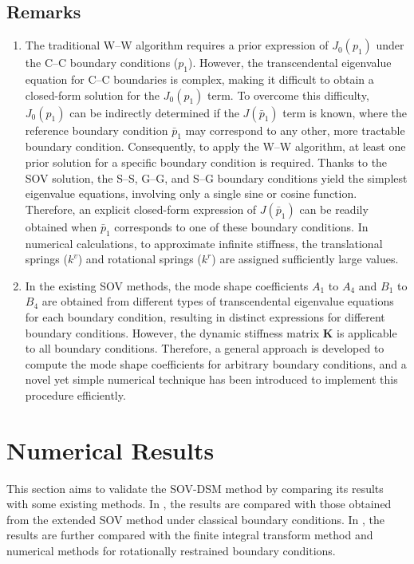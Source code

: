 \documentclass[preprint,12pt,number]{elsarticle}
\begin{document}
\subsection{Remarks}
\begin{enumerate}[label=(\roman*)]
	\item The traditional W–W algorithm requires a prior expression of $J_0(p_1)$ under the C–C boundary conditions ($p_1$).  
	However, the transcendental eigenvalue equation for C–C boundaries is complex, making it difficult to obtain a closed-form solution for the $J_0(p_1)$ term.  
	To overcome this difficulty, $J_0(p_1)$ can be indirectly determined if the $J(\bar{p}_1)$ term is known,  
	where the reference boundary condition $\bar{p}_1$ may correspond to any other, more tractable boundary condition.  
	Consequently, to apply the W–W algorithm, at least one prior solution for a specific boundary condition is required.  	
	Thanks to the SOV solution, the S–S, G–G, and S–G boundary conditions yield the simplest eigenvalue equations, involving only a single sine or cosine function.  
	Therefore, an explicit closed-form expression of $J(\bar{p}_1)$ can be readily obtained when $\bar{p}_1$ corresponds to one of these boundary conditions.  	
	In numerical calculations, to approximate infinite stiffness, the translational springs ($k^v$) and rotational springs ($k^r$) are assigned sufficiently large values.
	
	\item In the existing SOV methods, the mode shape coefficients $A_1$ to $A_4$ and $B_1$ to $B_4$ are obtained from different types of transcendental eigenvalue equations for each boundary condition, resulting in distinct expressions for different boundary conditions.  
	However, the dynamic stiffness matrix $\mathbf{K}$ is applicable to all boundary conditions.  
	Therefore, a general approach is developed to compute the mode shape coefficients for arbitrary boundary conditions,  
	and a novel yet simple numerical technique has been introduced to implement this procedure efficiently.
	
	
\end{enumerate}


\FloatBarrier
\section{Numerical Results}\label{sec:NR}  
This section aims to validate the SOV-DSM method by comparing its results with some existing methods.  
In , the results are compared with those obtained from the extended SOV method under classical boundary conditions.  
In , the results are further compared with the finite integral transform method and numerical methods for rotationally restrained boundary conditions.
\end{document}
